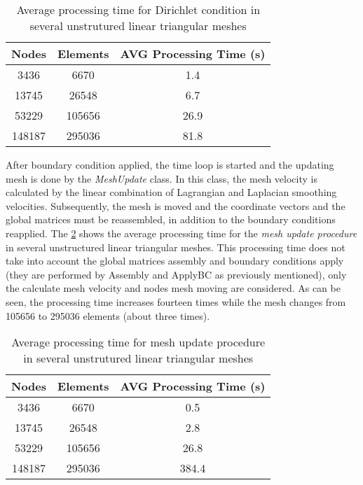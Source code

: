 \vspace{0.5cm}
\begin{table}[H]
\centering
\begin{tabular}{ccc}
\toprule
\textbf{Nodes} & \textbf{Elements} & \textbf{AVG Processing Time} (s) \\
\midrule
3436 & 6670 & 1.4 \\
13745 & 26548 & 6.7 \\
53229 & 105656 & 26.9 \\
148187 & 295036 & 81.8 \\



\bottomrule
\end{tabular}
\caption{Average processing time for Dirichlet condition in several unstrutured linear triangular meshes}
\label{tempo contorno}
\end{table}
 
\medskip
After boundary condition applied, the time loop is started and
the updating mesh is done by the \textit{MeshUpdate} class.
In this class, the mesh velocity is calculated by the
linear combination of Lagrangian and Laplacian smoothing velocities.
Subsequently, the mesh is moved and 
the coordinate vectors and the global matrices
must be reassembled, in addition to the boundary conditions reapplied.
The \ref{tempo mesh update} 
shows the average processing time for the \textit{mesh update procedure}
in several unstructured linear triangular meshes.
This processing time does not take into account the global matrices assembly and
boundary conditions apply (they are performed by Assembly and ApplyBC
 as previously mentioned), 
only the calculate mesh velocity and nodes mesh moving
are considered. 
As can be seen, the processing time increases fourteen times 
while the mesh changes from 105656 to 295036 elements 
(about three times). 

\vspace{0.5cm}
\begin{table}[H]
\centering
\begin{tabular}{ccc}
\toprule
\textbf{Nodes} & \textbf{Elements} & \textbf{AVG Processing Time} (s) \\
\midrule
3436 & 6670 & 0.5 \\
13745 & 26548 & 2.8 \\
53229 & 105656 & 26.8 \\
148187 & 295036 & 384.4 \\



\bottomrule
\end{tabular}
\caption{Average processing time for mesh update procedure in several unstrutured linear triangular meshes}
\label{tempo mesh update}
\end{table}

